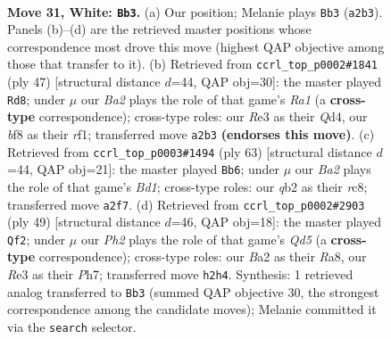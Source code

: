 \documentclass[11pt]{article}
\begin{document}
\clearpage

\begin{figure}[p]\centering
\begin{subfigure}{0.46\textwidth}\centering
\resizebox{\linewidth}{!}{%
\newchessgame
\chessboard[
  setfen={5b2/pp5p/6pk/8/8/P3R1P1/Bq3P1P/6K1 w - - 0 31},
  showmover=false,
  pgfstyle=straightmove, color=movearrow, markmove={a2-b3}
]}
\caption{}
\end{subfigure}\hfill
\begin{subfigure}{0.46\textwidth}\centering
\resizebox{\linewidth}{!}{%
\newchessgame
\chessboard[
  setfen={r5k1/p6p/1pQ2p2/8/3q4/8/PP4PP/5R1K b - - 1 24},
  showmover=false,
  pgfstyle=straightmove, color=movearrow, markmove={a8-d8}
]}
\caption{}
\end{subfigure}
\\[4pt]
\begin{subfigure}{0.46\textwidth}\centering
\resizebox{\linewidth}{!}{%
\newchessgame
\chessboard[
  setfen={2Rb4/1r3pk1/4p1pp/1P6/8/1P1B3P/5P2/5K2 b - - 0 32},
  showmover=false,
  pgfstyle=straightmove, color=movearrow, markmove={d8-b6}
]}
\caption{}
\end{subfigure}\hfill
\begin{subfigure}{0.46\textwidth}\centering
\resizebox{\linewidth}{!}{%
\newchessgame
\chessboard[
  setfen={r7/1Q3p1p/p5pk/8/3q4/3P4/PP4PP/4R2K b - - 2 25},
  showmover=false,
  pgfstyle=straightmove, color=movearrow, markmove={d4-f2}
]}
\caption{}
\end{subfigure}
\caption{\textbf{Move 31, White: \texttt{Bb3}.} (a) Our position; Melanie plays \texttt{Bb3} (\texttt{a2b3}). Panels (b)--(d) are the retrieved master positions whose correspondence most drove this move (highest QAP objective among those that transfer to it). (b) Retrieved from \texttt{ccrl\_top\_p0002\#1841} (ply 47) [structural distance $d$=44, QAP obj=30]: the master played \texttt{Rd8}; under $\mu$ our \emph{Ba2} plays the role of that game's \emph{Ra1} (a \textbf{cross-type} correspondence); cross-type roles: our \emph{R}e3 as their \emph{Q}d4, our \emph{b}f8 as their \emph{r}f1; transferred move \texttt{a2b3} \textbf{(endorses this move)}. (c) Retrieved from \texttt{ccrl\_top\_p0003\#1494} (ply 63) [structural distance $d$=44, QAP obj=21]: the master played \texttt{Bb6}; under $\mu$ our \emph{Ba2} plays the role of that game's \emph{Bd1}; cross-type roles: our \emph{q}b2 as their \emph{r}c8; transferred move \texttt{a2f7}. (d) Retrieved from \texttt{ccrl\_top\_p0002\#2903} (ply 49) [structural distance $d$=46, QAP obj=18]: the master played \texttt{Qf2}; under $\mu$ our \emph{Ph2} plays the role of that game's \emph{Qd5} (a \textbf{cross-type} correspondence); cross-type roles: our \emph{B}a2 as their \emph{R}a8, our \emph{R}e3 as their \emph{P}h7; transferred move \texttt{h2h4}. Synthesis: 1 retrieved analog transferred to \texttt{Bb3} (summed QAP objective 30, the strongest correspondence among the candidate moves); Melanie committed it via the \texttt{search} selector.}
\label{fig:thought-m60}
\end{figure}
\end{document}
